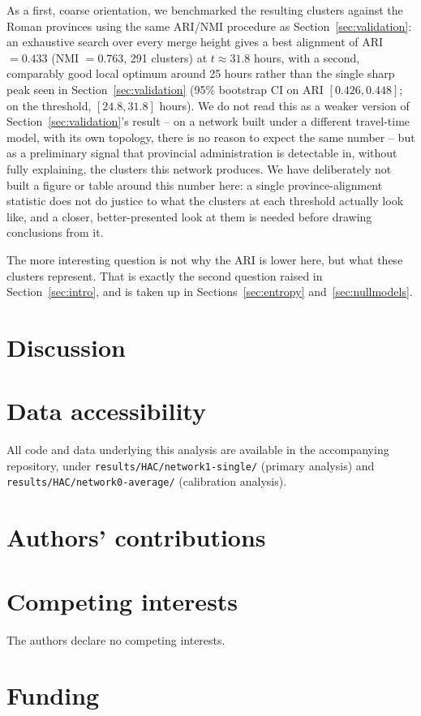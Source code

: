 \documentclass[11pt,a4paper]{article}
\begin{document}
As a first, coarse orientation, we benchmarked the resulting clusters
against the Roman provinces using the same ARI/NMI procedure as
Section~\ref{sec:validation}: an exhaustive search over every merge height
gives a best alignment of ARI $= 0.433$ (NMI $= 0.763$, 291 clusters) at
$t \approx 31.8$ hours, with a second, comparably good local optimum
around 25 hours rather than the single sharp peak seen in
Section~\ref{sec:validation} (95\% bootstrap CI on ARI $[0.426, 0.448]$;
on the threshold, $[24.8, 31.8]$ hours). We do not read this as a weaker
version of Section~\ref{sec:validation}'s result -- on a network built
under a different travel-time model, with its own topology, there is no
reason to expect the same number -- but as a preliminary signal that
provincial administration is detectable in, without fully explaining, the
clusters this network produces. We have deliberately not built a figure
or table around this number here: a single province-alignment statistic
does not do justice to what the clusters at each threshold actually look
like, and a closer, better-presented look at them is needed before drawing
conclusions from it.

The more interesting question is not why the ARI is lower here, but what
these clusters represent. That is exactly the second question raised in
Section~\ref{sec:intro}, and is taken up in
Sections~\ref{sec:entropy} and~\ref{sec:nullmodels}.

\section{Discussion}

\section*{Data accessibility}
All code and data underlying this analysis are available in the
accompanying repository, under \texttt{results/HAC/network1-single/}
(primary analysis) and \texttt{results/HAC/network0-average/}
(calibration analysis).

\section*{Authors' contributions}

\section*{Competing interests}
The authors declare no competing interests.

\section*{Funding}



\end{document}
